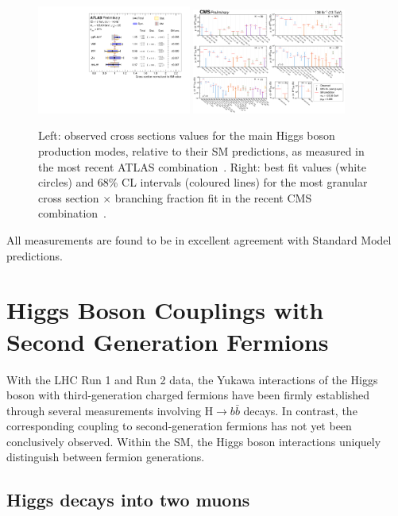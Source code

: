 \documentclass[a4paper,11pt]{article}
\begin{document}
\begin{figure}[!htbp]
\centering
\includegraphics[width=0.45\textwidth]{stxs-atlas-xsecs}
\includegraphics[width=0.45\textwidth]{stxs-cms-xsecs}
\caption
    {Left: observed cross sections values for the main Higgs boson
      production modes, relative to their SM predictions, as measured
      in the most recent ATLAS combination~\cite{atlas-comb}. Right:
      best fit values (white circles) and 68\% CL intervals (coloured
      lines) for the most granular cross section $\times$ branching
      fraction fit in the recent CMS combination~\cite{cms-comb}.
      \label{fig:stxs}
    }
\end{figure}
%
All measurements are found to be in excellent agreement with Standard Model predictions.

\section{Higgs Boson Couplings with Second Generation Fermions}

With the LHC Run 1 and Run 2 data, the Yukawa interactions of the
Higgs boson with third-generation charged fermions have been firmly
established through several measurements involving $\textrm{H}\to b\bar b$ decays. In contrast, the
corresponding coupling to second-generation fermions has not yet been
conclusively observed. Within the SM, the Higgs boson
interactions uniquely distinguish between fermion generations.

\subsection{Higgs decays into two muons}
\end{document}
